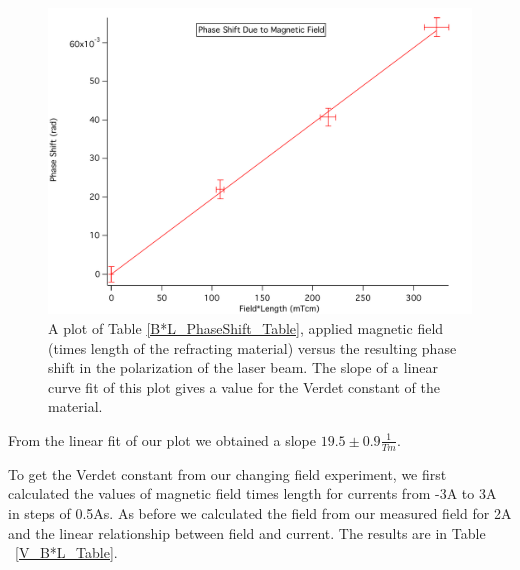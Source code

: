 \documentclass[prb,preprint]{revtex4-1}
\begin{document}
\begin{figure}[h!]
\centering
\includegraphics[width=5in]{PhaseShift_B-L_Plot.pdf}
\caption{A plot of Table \ref{B*L_PhaseShift_Table}, applied magnetic field (times length of the refracting material) versus the resulting phase shift in the polarization of the laser beam. The slope of a linear curve fit of this plot gives a value for the Verdet constant of the material. }
\label{PhaseShift_B*L_Plot}
\end{figure}

From the linear fit of our plot we obtained a slope $19.5 \pm0.9 \frac{1}{Tm}$.

To get the Verdet constant from our changing field experiment, we first calculated the values of magnetic field times length for currents from -3A to 3A in steps of 0.5As. As before we calculated the field from our measured field for 2A and the linear relationship between field and current. The results are in Table ~\ref{V_B*L_Table}. 
\end{document}
